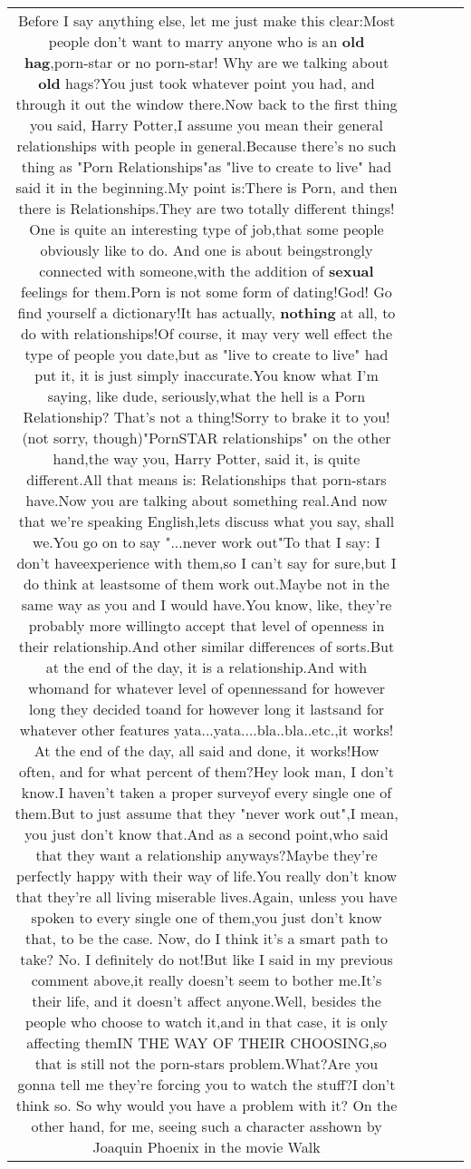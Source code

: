 \documentclass[11pt]{article}
\newlength\mylength
\begin{document}
\begin{center}
\begin{longtable}{|C{.65\mylength}|C{.30\mylength}|C{.12\mylength}|C{.12\mylength}|C{.12\mylength}|}
  \small Before I say anything else, let me just make this clear:Most people don't want to marry anyone who is an \textbf{o\textbf{ld} h\textbf{ag}},porn-star or no porn-star! Why are we talking about \textbf{old} hags?You just took whatever point you had, and through it out the window there.Now back to the first thing you said, Harry Potter,I assume you mean their general relationships with people in general.Because there's no such thing as "Porn Relationships"as "live to create to live" had said it in the beginning.My point is:There is Porn, and then there is Relationships.They are two totally different things!  One is quite an interesting type of job,that some people obviously like to do.  And one is about beingstrongly connected with someone,with the addition of \textbf{sexual} feelings for them.Porn is not some form of dating!God! Go find yourself a dictionary!It has actually, \textbf{nothing} at all, to do with relationships!Of course, it may very well effect the type of people you date,but as "live to create to live" had put it, it is just simply inaccurate.You know what I'm saying, like dude, seriously,what the hell is a Porn Relationship? That's not a thing!Sorry to brake it to you! (not sorry, though)"PornSTAR relationships" on the other hand,the way you, Harry Potter, said it, is quite different.All that means is: Relationships that porn-stars have.Now you are talking about something real.And now that we're speaking English,lets discuss what you say, shall we.You go on to say "...never work out"To that I say: I don't haveexperience with them,so I can't say for sure,but I do think at leastsome of them work out.Maybe not in the same way as you and I would have.You know, like, they're probably more willingto accept that level of openness in their relationship.And other similar differences of sorts.But at the end of the day, it is a relationship.And with whomand for whatever level of opennessand for however long they decided toand for however long it lastsand for whatever other features yata...yata....bla..bla..etc.,it works!  At the end of the day, all said and done, it works!How often, and for what percent of them?Hey look man, I don't know.I haven't taken a proper surveyof every single one of them.But to just assume that they "never work out",I mean, you just don't know that.And as a second point,who said that they want a relationship anyways?Maybe they're perfectly happy with their way of life.You really don't know that they're all living miserable lives.Again, unless you have spoken to every single one of them,you just don't know that, to be the case.       Now, do I think it's a smart path to take? No. I definitely do not!But like I said in my previous comment above,it really doesn't seem to bother me.It's their life, and it doesn't affect anyone.Well, besides the people who choose to watch it,and in that case, it is only affecting themIN THE WAY OF THEIR CHOOSING,so that is still not the porn-stars problem.What?Are you gonna tell me they're forcing you to watch the stuff?I don't think so. So why would you have a problem with it?      On the other hand, for me, seeing such a character asshown by Joaquin Phoenix in the movie Walk 
\end{longtable}
\end{center}
\end{document}

